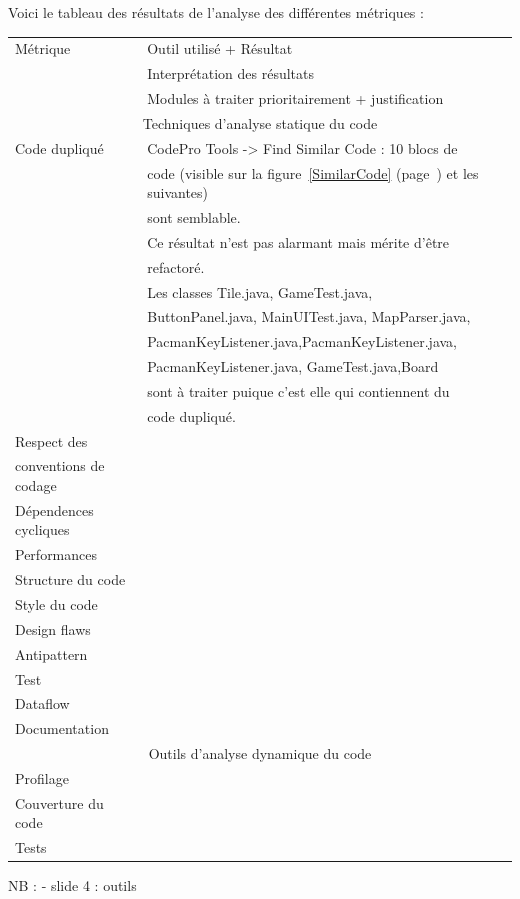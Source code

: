 \documentclass[12pt,a4paper,final]{article}
\newcommand{\annexe}[1]{figure~\ref{#1} (page~\pageref{#1})}
\begin{document}
Voici le tableau des résultats de l'analyse des différentes métriques : 
\begin{tabular}{|l|l|}
\hline
Métrique & Outil utilisé + Résultat \\ & Interprétation des résultats \\ & Modules à traiter prioritairement + justification\\
\hline
\multicolumn{2}{|c|}{Techniques d'analyse statique du code} \\
\hline
Code dupliqué & CodePro Tools -> Find Similar Code : 10 blocs de \\
& code (visible sur la \annexe{SimilarCode} et les suivantes)\\
& sont semblable. \\
& Ce résultat n'est pas alarmant mais mérite d'être\\
& refactoré. \\
& Les classes Tile.java, GameTest.java,  \\
& ButtonPanel.java, MainUITest.java, MapParser.java, \\
&  PacmanKeyListener.java,PacmanKeyListener.java, \\
&  PacmanKeyListener.java, GameTest.java,Board \\
& sont à traiter puique c'est elle qui contiennent du \\
& code dupliqué. \\
\hline
Respect des & \\
conventions de codage & \\
\hline
Dépendences cycliques & \\
\hline
Performances & \\
\hline
Structure du code & \\
\hline
Style du code & \\
\hline
Design flaws  & \\
\hline
Antipattern  & \\
\hline
Test & \\
\hline
Dataflow  & \\
\hline
Documentation & \\
\hline
\multicolumn{2}{|c|}{Outils d'analyse dynamique du code} \\
\hline
Profilage & \\
\hline
Couverture du code & \\
\hline
Tests & \\
\hline
\end{tabular}

NB : 
- slide 4 : outils
\end{document}
